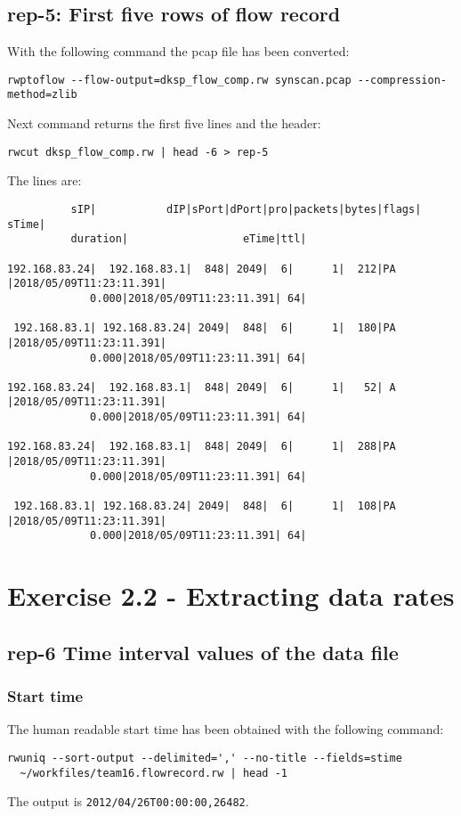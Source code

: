\subsection*{rep-5: First five rows of flow record}
With the following command the pcap file has been converted:
\begin{verbatim}
rwptoflow --flow-output=dksp_flow_comp.rw synscan.pcap --compression-method=zlib
\end{verbatim}
Next command returns the first five lines and the header:
\begin{verbatim}
rwcut dksp_flow_comp.rw | head -6 > rep-5
\end{verbatim}
The lines are:
\begin{verbatim}
          sIP|           dIP|sPort|dPort|pro|packets|bytes|flags|                  sTime|
          duration|                  eTime|ttl|
          
192.168.83.24|  192.168.83.1|  848| 2049|  6|      1|  212|PA   |2018/05/09T11:23:11.391|
             0.000|2018/05/09T11:23:11.391| 64|
             
 192.168.83.1| 192.168.83.24| 2049|  848|  6|      1|  180|PA   |2018/05/09T11:23:11.391|
             0.000|2018/05/09T11:23:11.391| 64|
             
192.168.83.24|  192.168.83.1|  848| 2049|  6|      1|   52| A   |2018/05/09T11:23:11.391|
             0.000|2018/05/09T11:23:11.391| 64|
             
192.168.83.24|  192.168.83.1|  848| 2049|  6|      1|  288|PA   |2018/05/09T11:23:11.391|
             0.000|2018/05/09T11:23:11.391| 64|
             
 192.168.83.1| 192.168.83.24| 2049|  848|  6|      1|  108|PA   |2018/05/09T11:23:11.391|
             0.000|2018/05/09T11:23:11.391| 64|
\end{verbatim}

\section*{Exercise 2.2 - Extracting data rates}

\subsection*{rep-6 Time interval values of the data file}
\subsubsection*{Start time}
The human readable start time has been obtained with the following command:
\begin{verbatim}
rwuniq --sort-output --delimited=',' --no-title --fields=stime
  ~/workfiles/team16.flowrecord.rw | head -1
\end{verbatim}
The output is \texttt{2012/04/26T00:00:00,26482}.

